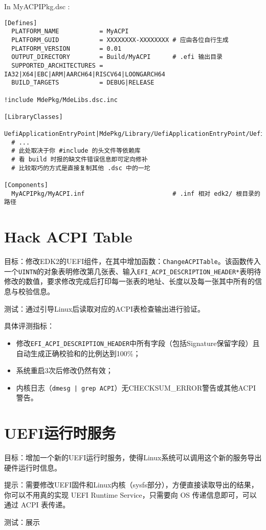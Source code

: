 In MyACPIPkg.dsc :

\begin{lstlisting}
[Defines]
  PLATFORM_NAME           = MyACPI
  PLATFORM_GUID           = XXXXXXXX-XXXXXXXX # 应由各位自行生成
  PLATFORM_VERSION        = 0.01
  OUTPUT_DIRECTORY        = Build/MyACPI      # .efi 输出目录
  SUPPORTED_ARCHITECTURES = IA32|X64|EBC|ARM|AARCH64|RISCV64|LOONGARCH64
  BUILD_TARGETS           = DEBUG|RELEASE

!include MdePkg/MdeLibs.dsc.inc
  
[LibraryClasses]
  UefiApplicationEntryPoint|MdePkg/Library/UefiApplicationEntryPoint/UefiApplicationEntryPoint.inf
  # ...
  # 此处取决于你 #include 的头文件等依赖库
  # 看 build 时报的缺文件错误信息即可定向修补
  # 比较取巧的方式是直接复制其他 .dsc 中的一坨
  
[Components]
  MyACPIPkg/MyACPI.inf                        # .inf 相对 edk2/ 根目录的路径
\end{lstlisting}

\section{Hack ACPI Table}
目标：修改EDK2的UEFI组件，在其中增加函数：\texttt{ChangeACPITable}。该函数传入一个\texttt{UINTN}的对象表明修改第几张表、输入\texttt{EFI\_ACPI\_DESCRIPTION\_HEADER*}表明待修改的数值，要求修改完成后打印每一张表的地址、长度以及每一张其中所有的信息与校验信息。

测试：通过引导Linux后读取对应的ACPI表检查输出进行验证。

具体评测指标：
\begin{itemize}
\item 修改\texttt{EFI\_ACPI\_DESCRIPTION\_HEADER}中所有字段（包括Signature保留字段）且自动生成正确校验和的比例达到100\%；
\item 系统重启3次后修改仍然有效；
\item 内核日志（\texttt{dmesg | grep ACPI}）无CHECKSUM\_ERROR警告或其他ACPI警告。
\end{itemize}

\section{UEFI运行时服务}
目标：增加一个新的UEFI运行时服务，使得Linux系统可以调用这个新的服务导出硬件运行时信息。

提示：需要修改UEFI固件和Linux内核（sysfs部分），方便直接读取导出的结果， 
你可以不用真的实现 UEFI Runtime Service，只需要向 OS 传递信息即可，可以通过 ACPI 表传递。

测试：展示
